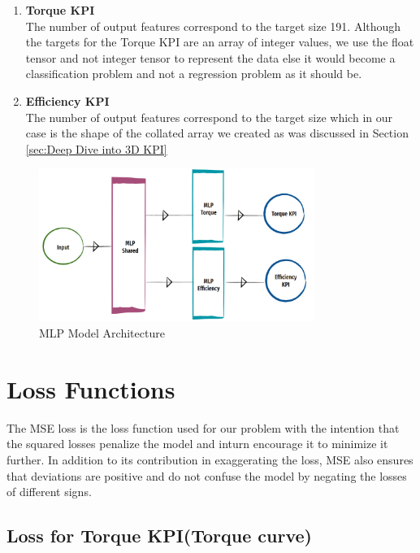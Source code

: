 \documentclass{report} %
\begin{document}
\begin{enumerate}
    \item \textbf{Torque \ac{KPI}} \\
    The number of output features correspond to the target size 191.
    Although the targets for the Torque \ac{KPI} are an array of integer values, we use the float tensor and not integer tensor to represent the data else it would become a classification problem and not a regression problem as it should be. 
    \item \textbf{Efficiency \ac{KPI}} \\
    The number of output features correspond to the target size which in our case is the shape of the collated array we created as was discussed in Section \ref{sec:Deep Dive into 3D KPI}
\end{enumerate}

\begin{figure}[H]
    \centering
    \includegraphics[width=0.8\textwidth]{./ReportImages/mlp_architecture.png} 
    \caption{MLP Model Architecture}
    \label{fig:MLP Model Architecture}
\end{figure}

\section{Loss Functions}\label{sec:Loss Functions}
The \ac{MSE} loss is the loss function used for our problem with the intention that the squared losses penalize the model and inturn encourage it to minimize it further.
In addition to its contribution in exaggerating the loss, \ac{MSE} also ensures that deviations are positive and do not confuse the model by negating the losses of different signs. \\

\subsection{Loss for Torque \ac{KPI}(Torque curve)}\label{sec:Loss for 2D KPI}
\end{document}
